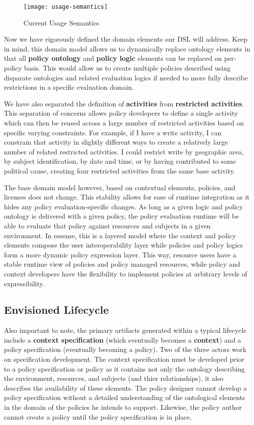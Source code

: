 \begin{figure}[!t]
\centering
\texttt{[image: usage-semantics]}
\caption{Current Usage Semantics}
\label{fig:model:usage-semantics}
\end{figure}

Now we have rigorously defined the domain elements our DSL will address.  Keep in mind, this domain model allows us to dynamically replace ontology elements in that all \textbf{policy ontology} and \textbf{policy logic} elements can be replaced on per-policy basis.  This would allow us to create multiple policies described using disparate ontologies and related evaluation logics if needed to more fully describe restrictions in a specific evaluation domain.

We have also separated the definition of \textbf{activities} from \textbf{restricted activities}.  This separation of concerns allows policy developers to define a single activity which can then be reused across a large number of restricted activities based on specific varying constraints.  For example, if I have a write activity, I can constrain that activity in slightly different ways to create a relatively large number of related restricted activities.  I could restrict write by geographic area, by subject identification, by date and time, or by having contributed to some political cause, creating four restricted activities from the same base activity.

The base domain model however, based on contextual elements, policies, and licenses does not change.  This stability allows for ease of runtime integration as it hides any policy evaluation-specific changes.  As long as a given logic and policy ontology is delivered with a given policy, the policy evaluation runtime will be able to evaluate that policy against resources and subjects in a given environment.  In essense, this is a layered model where the context and policy elements compose the user interoperability layer while policies and policy logics form a more dynamic policy expression layer.  This way, resource users have a stable runtime view of policies and policy managed resources, while policy and context developers have the flexibility to implement policies at arbitrary levels of expressibility.

\subsection{Envisioned Lifecycle}
Also important to note, the primary artifacts generated within a typical lifecycle include a \textbf{context specification} (which eventually becomes a \textbf{context}) and a policy specification (eventually becoming a policy).  Two of the three actors work on specification development.  The context specification must be developed prior to a policy specification or policy as it contains not only the ontology describing the environment, resources, and subjects (and thier relationships), it also describes the availability of these elements.  The policy designer cannot develop a policy specification without a detailed understanding of the ontological elements in the domain of the policies he intends to support.  Likewise, the policy author cannot create a policy until the policy specification is in place.

